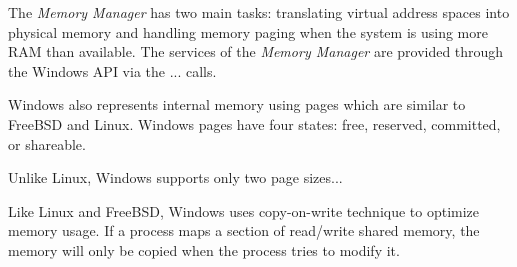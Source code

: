 The \textit{Memory Manager} has two main tasks: translating virtual address spaces into physical memory and handling memory paging when the system is using more RAM than available.  The services of the \textit{Memory Manager} are provided through the Windows API via the  ... calls.

Windows also represents internal memory using pages which are similar to FreeBSD and Linux.  Windows pages have four states: free, reserved, committed, or shareable.

Unlike Linux, Windows supports only two page sizes...

Like Linux and FreeBSD, Windows uses copy-on-write technique to optimize memory usage.  If a process maps a section of read/write shared memory, the memory will only be copied when the process tries to modify it.
